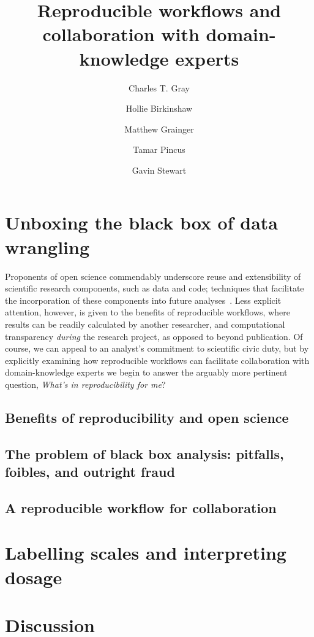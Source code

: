 \documentclass{article}
\title{Reproducible workflows and collaboration with domain-knowledge experts}
\author[1]{Charles T. Gray}
\author[2]{Hollie Birkinshaw}
\author[3]{Matthew Grainger}
\author[2]{Tamar Pincus}
\author[1]{Gavin Stewart}
\affil[1]{Newcastle University}
\affil[2]{Royal Holloway}
\affil[3]{NINA}
\begin{document}


\maketitle

\section{Unboxing the black box of data wrangling}


Proponents of open science commendably underscore reuse and extensibility of 
scientific research components, such as data and code; techniques that facilitate the incorporation of these components into future analyses~\cite{laine_2018, peng_reproducible_2011-1, wilkinson_2016}. Less explicit attention, however, is given to the benefits of reproducible workflows, where results can be readily calculated by another researcher, and computational transparency \emph{during} the research project, as opposed to beyond publication. Of course, we can appeal to an analyst's commitment to scientific civic duty, but by explicitly examining how reproducible workflows can facilitate collaboration with domain-knowledge experts we begin to answer the arguably more pertinent question, \emph{What's in reproducibility for me}?      

\subsection{Benefits of reproducibility and open science}

\subsection{The problem of black box analysis: pitfalls, foibles, and outright fraud}

\subsection{A reproducible workflow for collaboration}

\section{Labelling scales and interpreting dosage}

\section{Discussion}




\end{document}
